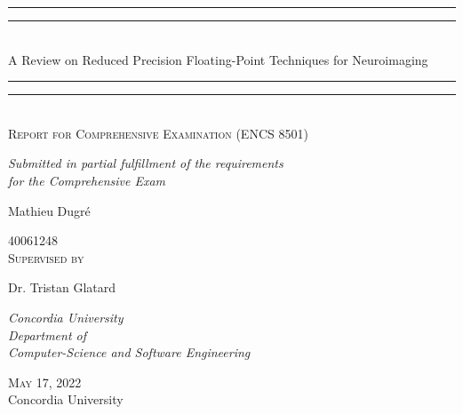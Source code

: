 \documentclass{report}
\begin{document}

\newlength{\drop}
\begin{titlepage}
	\textheight
	\centering
	\vspace*{\baselineskip}
					
	\rule{\textwidth}{1.6pt}\vspace*{-\baselineskip}\vspace*{2pt}
	\rule{\textwidth}{0.4pt}\\[\baselineskip]
	{\LARGE A Review on Reduced Precision Floating-Point Techniques for Neuroimaging}\\[0.2\baselineskip]
	\rule{\textwidth}{0.4pt}\vspace*{-\baselineskip}\vspace{3.2pt}
	\rule{\textwidth}{1.6pt}\\[\baselineskip]
				
	{\scshape Report for Comprehensive Examination (ENCS 8501)}\\
	{\itshape Submitted in partial fulfillment of the requirements \\ for the Comprehensive Exam\par}
	\vspace*{2\baselineskip}
						
	{\Large Mathieu Dugré \par}
	{40061248}\\[2\baselineskip]
	{\scshape Supervised by}\\[0.2\baselineskip]
	{\Large Dr. Tristan Glatard \par}
	{\itshape Concordia University \\  Department of \\ Computer-Science and Software Engineering\par}
						    
	\vfill
	{\scshape May 17, 2022} \\
	{\large Concordia University}\par
\end{titlepage}

\tableofcontents

\clearpage
{}








\end{document}
